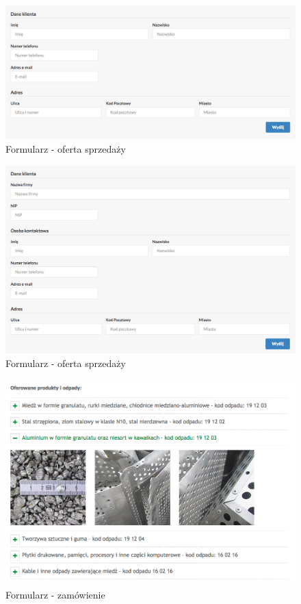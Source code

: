	\begin{figure}[H]
		\centering
		\centerline{\includegraphics[width=1.2\textwidth]{partials/2-wymagania/dokumenty/oferta.png}}
		\caption{Formularz - oferta sprzedaży}
	\end{figure}

	\begin{figure}[H]
		\centering
		\centerline{\includegraphics[width=1.2\textwidth]{partials/2-wymagania/dokumenty/oferta-firma.png}}
		\caption{Formularz - oferta sprzedaży}
	\end{figure}

	\begin{figure}[H]
		\centering
		\centerline{\includegraphics[width=1.2\textwidth]{partials/2-wymagania/dokumenty/zamowienie.png}}
		\caption{Formularz - zamówienie}
	\end{figure}	

